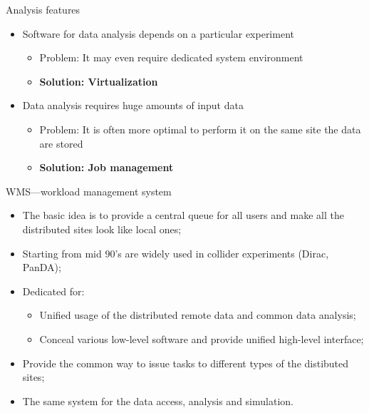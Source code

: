 \documentclass[18pt]{beamer}
\newcommand{\itemarrow}{\scriptsize\raise1.25pt\hbox{\textcolor{kit-green100}{$\blacktriangleright$}}}
\newcommand{\concl}[1]{\item[\itemarrow]\textcolor{kit-green100}{#1}}
\begin{document}
\begin{frame}{Analysis features}
\begin{itemize}
  \item Software for data analysis depends on a particular experiment
  \begin{itemize}
    \item Problem: It may even require dedicated system environment
    \concl{\textbf{Solution: Virtualization}}
  \end{itemize}
  \item Data analysis requires huge amounts of input data
  \begin{itemize}
    \item Problem: It is often more optimal to perform it on the same site the data are stored
    \concl{\textbf{Solution: Job management}}
  \end{itemize}
\end{itemize}
\end{frame}

\begin{frame}{WMS---workload management system}
\begin{itemize}
  \item The basic idea is to provide a central queue for all users and make all the distributed sites look like local ones;
  \item Starting from mid 90's are widely used in collider experiments (Dirac, PanDA);
  \item Dedicated for:
  \begin{itemize}
  \item Unified usage of the distributed remote data and common data analysis;
  \item Conceal various low-level software and provide unified high-level interface;
  \end{itemize}
  \item Provide the common way to issue tasks to different types of the distibuted sites;
  \item
  The same system for the data access, analysis and simulation.
\end{itemize}
\end{frame}
\end{document}
